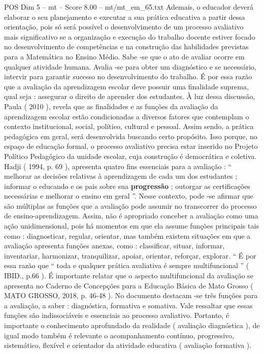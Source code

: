 \begin{textsample}{POS Dim 5 – mt – Score 8.00 – mt/mt\_em\_65.txt}
Ademais, o educador deverá elaborar o seu planejamento e executar a sua prática educativa a partir dessa orientação, pois só será possível o desenvolvimento de um processo avaliativo mais significativo se a organização e execução do trabalho docente estiver focado no desenvolvimento de competências e na construção das habilidades previstas para a Matemática no Ensino Médio.
Sabe -se que o ato de avaliar ocorre em qualquer atividade humana.
Avalia -se para obter um diagnóstico e se necessário, intervir para garantir sucesso no desenvolvimento do trabalho.
É por essa razão que a avaliação da aprendizagem escolar deve possuir uma finalidade suprema, qual seja : assegurar o direito de aprender dos estudantes.
À luz dessa discussão, Paula ( 2010 ), revela que as finalidades e as funções da avaliação da aprendizagem escolar estão condicionadas a diversos fatores que contemplam o contexto institucional, social, político, cultural e pessoal.
Assim sendo, a prática pedagógica em geral, será desenvolvida buscando certo propósito.
Isso porque, no espaço de educação formal, o processo avaliativo precisa estar inserido no Projeto Político Pedagógico da unidade escolar, cuja construção é democrática e coletiva.
Hadji ( 1994, p. 69 ), apresenta quatro fins essenciais para a avaliação : “ melhorar as decisões relativas à aprendizagem de cada um dos estudantes ; informar o educando e os pais sobre sua \textbf{progressão} ; outorgar as certificações necessárias e melhorar o ensino em geral ”.
Nesse contexto, pode -se afirmar que são múltiplas as funções que a avaliação pode assumir no transcorrer do processo de ensino-aprendizagem.
Assim, não é apropriado conceber a avaliação como uma ação unidimensional, pois há momentos em que ela assume funções principais tais como : diagnosticar, regular, orientar, mas também existem situações em que a avaliação apresenta funções anexas, como : classificar, situar, informar, inventariar, harmonizar, tranquilizar, apoiar, orientar, reforçar, explorar. “ É por essa razão que “ toda e qualquer prática avaliativa é sempre multifuncional ” ( IBID., p.66 ).
É importante relatar que o aspecto multifuncional da avaliação se apresenta no Caderno de Concepções para a Educação Básica de Mato Grosso ( MATO GROSSO, 2018, p. 46-48 ).
No documento destacam -se três funções para a avaliação, a saber : diagnóstica, formativa e somativa.
Vale ressaltar que essas funções são indissociáveis e essenciais ao processo avaliativo.
Portanto, é importante o conhecimento aprofundado da realidade ( avaliação diagnóstica ), de igual modo também é relevante o acompanhamento contínuo, progressivo, sistemático, flexível e orientador da atividade educativa ( avaliação formativa ).

\end{textsample}
